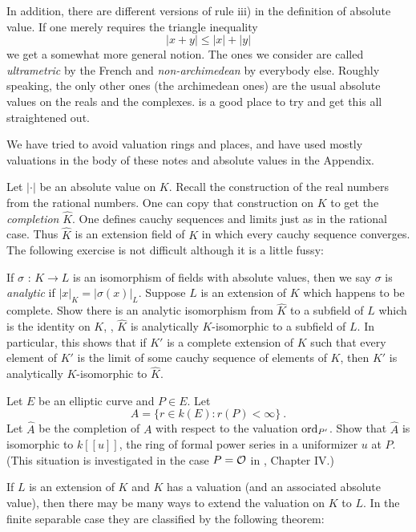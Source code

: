 In addition, there are different versions of rule iii) in the definition of absolute value. If one merely requires the triangle inequality
$$
|x+y|\leq|x|+|y|
$$
we get a somewhat more general notion. The ones we consider are called {\it ultrametric} by the French and {\it non-archimedean} by everybody else. Roughly speaking, the only other ones (the archimedean ones) are the usual absolute values on the reals and the complexes. \cite{r2.4} is a good place to try and get this all straightened out.

We have tried to avoid valuation rings and places, and have used mostly valuations in the body of these notes and absolute values in the Appendix.

Let $|\cdot|$ be an absolute value on $K$. Recall the construction of the real numbers from the rational numbers. One can copy that construction on $K$ to get the {\it completion} $\hat{K}$. One defines cauchy sequences and limits just as in the rational case. Thus $\hat{K}$ is an extension field of $K$ in which every cauchy sequence converges. The following exercise is not difficult although it is a little fussy:

\begin{exo}
\label{e2.8.16}
If $\sigma$ : $K\rightarrow L$ is an isomorphism of fields with absolute values, then we say $\sigma$ is {\it analytic} if $|x|_{K}=|\sigma(x)|_L$. Suppose $L$ is an extension of $K$ which happens to be complete. Show there is an analytic isomorphism from $\hat{K}$ to a subfield of $L$ which is the identity on $K$, \ie, $\hat{K}$ is analytically $K$-isomorphic to a subfield of $L$. In particular, this shows that if $K'$ is a complete extension of $K$ such that every element of $K'$ is the limit of some cauchy sequence of elements of $K$, then $K'$ is analytically $K$-isomorphic to $\hat{K}$.
\end{exo}

\begin{exo}
\label{e2.8.17}
Let $E$ be an elliptic curve and $P\in E$. Let
$$
A=\{r\in k(E):r(P)<\infty\}\ .
$$
Let $\hat{A}$ be the completion of $A$ with respect to the valuation $\operatorname{ord}_{P'}$. Show that $\hat{A}$ is isomorphic to $k[[u]]$, the ring of formal power series in a uniformizer $u$ at $P$. (This situation is investigated in the case $P=\mathcal{O}$ in \cite{r1.6}, Chapter IV.)
\end{exo}

If $L$ is an extension of $K$ and $K$ has a valuation (and an associated absolute value), then there may be many ways to extend the valuation on $K$ to $L$. In the finite separable case they are classified by the following theorem:


